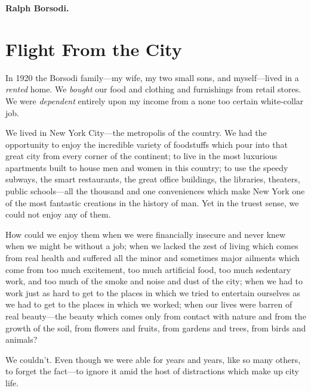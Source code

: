 \documentclass{book}
\begin{document}
\textbf{Ralph Borsodi.}

\chapter{Flight From the City}
\label{chapter-1}
In 1920 the Borsodi family—my wife, my two small sons, and myself—lived in a \emph{rented} home. We \emph{bought} our food and clothing and furnishings from retail stores. We were \emph{dependent} entirely upon my income from a none too certain white-collar job.

We lived in New York City—the metropolis of the country. We had the opportunity to enjoy the incredible variety of foodstuffs which pour into that great city from every corner of the continent; to live in the most luxurious apartments built to house men and women in this country; to use the speedy subways, the smart restaurants, the great office buildings, the libraries, theaters, public schools—all the thousand and one conveniences which make New York one of the most fantastic creations in the history of man. Yet in the truest sense, we could not enjoy any of them.

How could we enjoy them when we were financially insecure and never knew when we might be without a job; when we lacked the zest of living which comes from real health and suffered all the minor and sometimes major ailments which come from too much excitement, too much artificial food, too much sedentary work, and too much of the smoke and noise and dust of the city; when we had to work just as hard to get to the places in which we tried to entertain ourselves as we had to get to the places in which we worked; when our lives were barren of real beauty—the beauty which comes only from contact with nature and from the growth of the soil, from flowers and fruits, from gardens and trees, from birds and animals?

We couldn’t. Even though we were able for years and years, like so many others, to forget the fact—to ignore it amid the host of distractions which make up city life.
\end{document}
